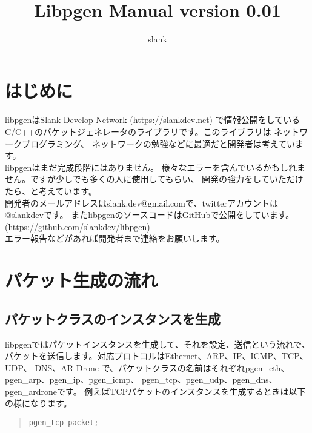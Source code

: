 \documentclass[12pt]{jsarticle}
\begin{document}
\title{~ \\ ~ \\ ~ \\ ~ \\Libpgen Manual version 0.01}
\author{slank}
\maketitle


\section{はじめに}


libpgenはSlank Develop Network (https://slankdev.net) で情報公開をしている
C/C++のパケットジェネレータのライブラリです。このライブラリは
ネットワークプログラミング、
ネットワークの勉強などに最適だと開発者は考えています。\\


libpgenはまだ完成段階にはありません。
様々なエラーを含んでいるかもしれません。ですが少しでも多くの人に使用してもらい、
開発の強力をしていただけたら、と考えています。\\


開発者のメールアドレスはslank.dev@gmail.comで、twitterアカウントは@slankdevです。
またlibpgenのソースコードはGitHubで公開をしています。
(https://github.com/slankdev/libpgen)\\


エラー報告などがあれば開発者まで連絡をお願いします。



\newpage




\section{パケット生成の流れ}
\subsection{パケットクラスのインスタンスを生成}
libpgenではパケットインスタンスを生成して、それを設定、送信という流れで、
パケットを送信します。対応プロトコルはEthernet、ARP、IP、ICMP、TCP、UDP、
DNS、AR Drone
で、パケットクラスの名前はそれぞれpgen\_eth、pgen\_arp、pgen\_ip、pgen\_icmp、
pgen\_tcp、pgen\_udp、pgen\_dns、pgen\_ardroneです。
例えばTCPパケットのインスタンスを生成するときは以下の様になります。

\begin{quote}
\begin{verbatim}
pgen_tcp packet;
\end{verbatim}
\end{quote}
\end{document}
